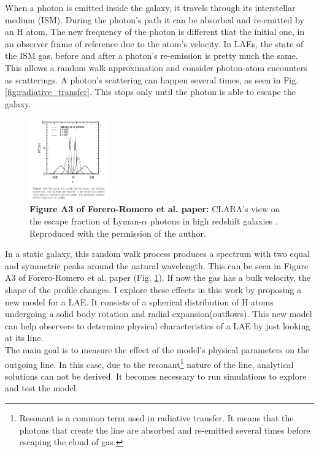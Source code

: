 \documentclass{latex/emulateapj}
\begin{document}
When a \lya photon is emitted inside the galaxy, it travels through its interstellar medium (ISM). During the photon's path it can be absorbed and re-emitted by an H atom. The new frequency of the photon is different that the initial one, in an observer frame of reference due to the atom's velocity. In LAEs, the state of the ISM gas, before and after a photon's re-emission is pretty much the same. This allows a random walk approximation and consider photon-atom encounters as scatterings. A photon's scattering can happen several times, as seen in Fig. \ref{fig:radiative_transfer}. This stops only until the photon is able to escape the galaxy. \\

\begin{figure}[h!]
	\begin{center}
		\includegraphics[width=0.3\textwidth]{./figures/static}
	\end{center}
	\caption{\textbf{Figure A3 of Forero-Romero et al. paper:} CLARA's view on the escape fraction of Lyman-$\alpha$ photons in high redshift galaxies \cite{CLARA}. Reproduced with the permission of the author.
		\label{fig:static}}
\end{figure}

In a static galaxy, this random walk process produces a spectrum with two equal and symmetric peaks around the natural \lya wavelength. This can be seen in Figure A3 of Forero-Romero et al. paper \cite{CLARA} (Fig. \ref{fig:static}). If now the gas has a bulk velocity, the shape of the \lya profile changes. I explore these effects in this work by proposing a new model for a LAE. It consists of a spherical distribution of H atoms undergoing a solid body rotation and radial expansion(outflows). This new model can help observers to determine physical characteristics of a LAE by just looking at its \lya line. \\

The main goal is to measure the effect of the model's physical parameters on the outgoing \lya line. In this case, due to the resonant\footnote{Resonant is a common term used in radiative transfer. It means that the photons that create the line are absorbed and re-emitted several times before escaping the cloud of gas.} nature of the \lya line, analytical solutions can not be derived. It becomes necessary to run simulations to explore and test the model. \\
\end{document}
